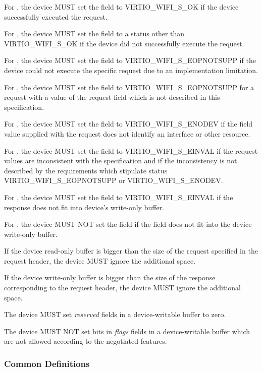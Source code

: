 For , the device MUST set the
 field to VIRTIO_WIFI_S_OK if the device successfully
executed the request.

For , the device MUST set the
 field to a status other than VIRTIO_WIFI_S_OK if the
device did not successfully execute the request.

For , the device MUST set the
 field to VIRTIO_WIFI_S_EOPNOTSUPP if the device could not
execute the specific request due to an implementation limitation.

For , the device MUST set the
 field to VIRTIO_WIFI_S_EOPNOTSUPP for a request with a
value of the request  field which is not described in this
specification.

For , the device MUST set the
 field to VIRTIO_WIFI_S_ENODEV if the 
field value supplied with the request does not identify an interface or other resource.

For , the device MUST set the
 field to VIRTIO_WIFI_S_EINVAL if the request values are
inconsistent with the specification and if the inconsistency is not
described by the requirements which stipulate status
VIRTIO_WIFI_S_EOPNOTSUPP or VIRTIO_WIFI_S_ENODEV.

For , the device MUST set the  field
to VIRTIO_WIFI_S_EINVAL if the response does not fit into device's write-only
buffer.

For , the device MUST NOT set the
 field if the  field does not fit into the
device write-only buffer.

If the device read-only buffer is bigger than the size of the request
specified in the request header, the device MUST ignore the additional
space.

If the device write-only buffer is bigger than the size of the response
corresponding to the request header, the device MUST ignore the
additional space.

The device MUST set \emph{reserved} fields in a device-writable buffer
to zero.

The device MUST NOT set bits in \emph{flags} fields in a device-writable
buffer which are not allowed according to the negotiated features.

\subsubsection{Common Definitions}\label{sec:Device Types / 802.11 Device / Device Operation / Common Definitions}


